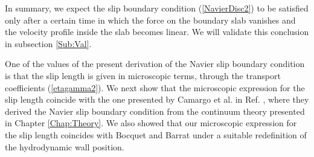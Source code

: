 \documentclass[b5paper,openright,10pt]{book}
\begin{document}
In summary, we expect  the slip boundary condition (\ref{NavierDisc2})
to be satisfied  only after a certain  time in which the  force on the
boundary  slab  vanishes and  the  velocity  profile inside  the  slab
becomes  linear.  We  will  validate  this  conclusion  in  subsection
\ref{Sub:Val}.


One  of the  values  of  the present  derivation  of  the Navier  slip
boundary condition  is that  the slip length  is given  in microscopic
terms, through the transport  coefficients (\ref{etagamma2}).  We next
show that the microscopic expression for the slip length coincide with
the one presented by Camargo et al. in  Ref.  \cite{CamargoBC2018}, where they derived the Navier
slip  boundary  condition  from  the  continuum  theory  presented  in
Chapter \ref{Chap:Theory}.   We  also   showed  that   our  microscopic
expression  for the  slip length  coincides with  Bocquet and Barrat under  a suitable
redefinition of the hydrodynamic wall position.
\end{document}
